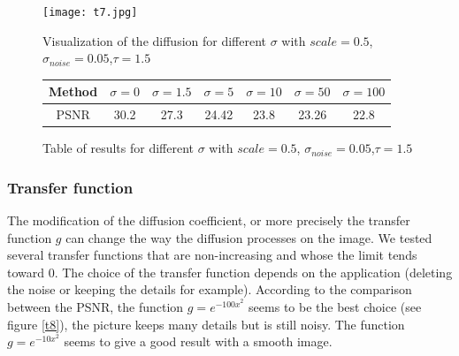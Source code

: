 \documentclass{report}
\begin{document}
         \begin{figure}
         \label{t7}
        \centering
        \caption{Visualization of the diffusion for different $\sigma$ with $scale=0.5$, $\sigma_{noise}=0.05$,$\tau=1.5$ }
        \texttt{[image: t7.jpg]}
        \end{figure}
        
       



 \begin{figure}[h!]
        \centering
        \label{T7}
         \caption{Table of results for different $\sigma$ with $scale=0.5$, $\sigma_{noise}=0.05$,$\tau=1.5$}
        \begin{tabular}{|c|c|c|c|c|c|c|}
        \hline
        Method & $\sigma=0$ & $\sigma=1.5$ & $\sigma=5$ & $\sigma=10$ & $\sigma=50$ & $\sigma=100$ \\
        \hline
        PSNR  & 30.2 & 27.3 & 24.42 & 23.8 & 23.26 & 22.8 \\
        \hline
        \end{tabular}
        \end{figure}







\subsubsection{Transfer function}


The modification of the diffusion coefficient, or more precisely the transfer function $g$ can change the way the diffusion processes on the image. We tested several transfer functions that are non-increasing and whose the limit tends toward 0. The choice of the transfer function depends on the application (deleting the noise or keeping the details for example). According to the comparison between the PSNR, the function $g= e^{-{100 x}^2}$ seems to be the best choice (see figure \ref{t8}), the picture keeps many details but is still noisy. The function $g= e^{-{10 x}^2}$ seems to give a good result with a smooth image.  \\


\end{document}
